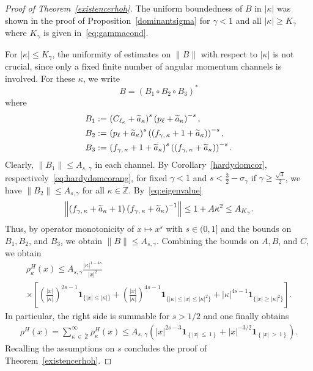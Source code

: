 \documentclass[AHL,Unicode,longabstracts,published]{cedram}
\newcommand*\gz{\mathbb{Z}}
\newcommand*\zp{\dot{\gz}}
\newcommand{\one}{\mathbf{1}}
\let\oldtilde\tilde
\renewcommand*{\tilde}[1]{\mathchoice{\widetilde{#1}}{\widetilde{#1}}{\oldtilde{#1}}{\oldtilde{#1}}}
\begin{document}
\begin{proof}[{Proof of Theorem~\ref{existencerhoh}}]
The uniform boundedness of $B$ in $|\kappa|$ was shown in the proof of Proposition~\ref{dominantsigma} for $\gamma<1$ and all $|\kappa|\geq K_\gamma$ where $K_\gamma$ is given in~\eqref{eq:gammacond}.

For $|\kappa|\leq K_\gamma$, the uniformity of estimates on $\|B\|$ with respect to $|\kappa|$ is not crucial, since only a fixed finite number of angular momentum channels is involved. For these $\kappa$, we write
\begin{equation}
B=\left(B_1\circ B_2\circ B_3\right)^*
\end{equation}
where
\begin{align*}
B_1 :=\, &\left(C_{\ell_\kappa}+\tilde a_\kappa\right)^s \left(p_\ell+\tilde a_\kappa\right)^{-s}, \\
B_2 :=\, &\left(p_\ell+\tilde a_\kappa\right)^{s}\left(\left(f_{\gamma,\,\kappa}+1+\tilde a_\kappa\right)\right)^{-s},\\
B_3 :=\, &\left(f_{\gamma,\,\kappa}+1+\tilde a_\kappa\right)^{s}\left(\left(f_{\gamma,\,\kappa}+\tilde a_\kappa\right)\right)^{-s}.
\end{align*}
Clearly, $\|B_1\|\leq A_{s,\,\gamma}$ in each channel. By Corollary~\ref{hardydomcor}, respectively~\eqref{eq:hardydomcorang}, for fixed $\gamma<1$ and $s<\frac32-\sigma_\gamma$ if $\gamma\geq\frac{\sqrt3}2$, we have $\|B_2\|\leq A_{s,\gamma}$ for all $\kappa\in\zp$. By~\eqref{eq:eigenvalue}
\begin{equation}
\left\|\left(f_{\gamma,\,\kappa}+\tilde a_\kappa+1\right)\left(f_{\gamma,\,\kappa}+\tilde a_\kappa\right)^{-1}\right\| \leq 1 + A \kappa^2 \leq A_{K_\gamma}.
\end{equation}
Thus, by operator monotonicity of $x\mapsto x^s$ with $s\in(0,1]$ and the bounds on $B_1,B_2$, and $B_3$, we obtain $ \|B\|\leq A_{s,\gamma}$. Combining the bounds on $A,B$, and $C$, we obtain
\begin{multline*}
\rho_{\kappa}^H(x) \leq A_{s,\gamma} \frac{|\kappa|^{1-4s}}{|x|^2}\\
\times \left[\left(\frac{|x|}{|\kappa|}\right)^{2s-1}\one_{\{|x| \leq |\kappa|\}}+\left(\frac{|x|}{|\kappa|}\right)^{4s-1}\one_{\{|\kappa| \leq |x| \leq |\kappa|^2\}} + |\kappa|^{4s-1}\one_{\{|x| \geq |\kappa|^2\}}\right].
\end{multline*}
In particular, the right side is summable for $s>1/2$ and one finally obtains
\begin{align*}
\rho^H(x) = \sum_{\kappa\,\in\,\zp}^\infty \rho_\kappa^H(x)
\leq A_{s,\,\gamma} \left(|x|^{2s-3}\one_{\left\{|x|\,\leq\,1\right\}} + |x|^{-3/2}\one_{\left\{|x|\,>\,1\right\}}\right).
\end{align*}
Recalling the assumptions on $s$ concludes the proof of Theorem~\ref{existencerhoh}.
\end{proof}
\end{document}
